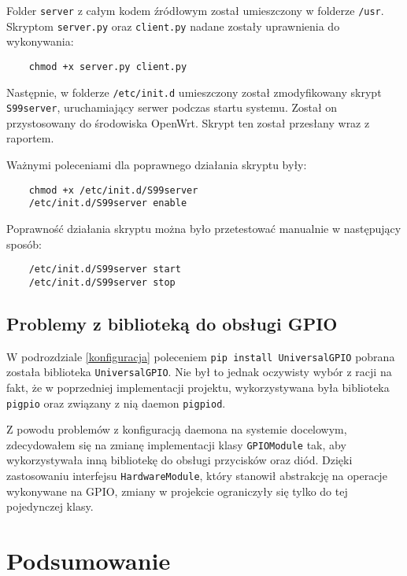 \documentclass{article}
\begin{document}
Folder \texttt{server} z całym kodem źródłowym został umieszczony w folderze \texttt{/usr}. Skryptom \texttt{server.py} oraz \texttt{client.py} nadane zostały uprawnienia do wykonywania:

\begin{verbatim}
    chmod +x server.py client.py
\end{verbatim}

Następnie, w folderze \texttt{/etc/init.d} umieszczony został zmodyfikowany skrypt \texttt{S99server}, uruchamiający serwer podczas startu systemu. Został on przystosowany do środowiska OpenWrt. Skrypt ten został przesłany wraz z raportem.

Ważnymi poleceniami dla poprawnego działania skryptu były:

\begin{verbatim}
    chmod +x /etc/init.d/S99server 
    /etc/init.d/S99server enable
\end{verbatim}

Poprawność działania skryptu można było przetestować manualnie w następujący sposób:

\begin{verbatim}
    /etc/init.d/S99server start 
    /etc/init.d/S99server stop 
\end{verbatim}

\subsection{Problemy z biblioteką do obsługi GPIO}

W podrozdziale \ref{konfiguracja} poleceniem \texttt{pip install UniversalGPIO} pobrana została biblioteka \texttt{UniversalGPIO}. Nie był to jednak oczywisty wybór z racji na fakt, że w poprzedniej implementacji projektu, wykorzystywana była biblioteka \texttt{pigpio} oraz związany z nią daemon \texttt{pigpiod}.

Z powodu problemów z konfiguracją daemona na systemie docelowym, zdecydowałem się na zmianę implementacji klasy \texttt{GPIOModule} tak, aby wykorzystywała inną bibliotekę do obsługi przycisków oraz diód. Dzięki zastosowaniu interfejsu \texttt{HardwareModule}, który stanowił abstrakcję na operacje wykonywane na GPIO, zmiany w projekcie ograniczyły się tylko do tej pojedynczej klasy.

\section{Podsumowanie}
\end{document}
